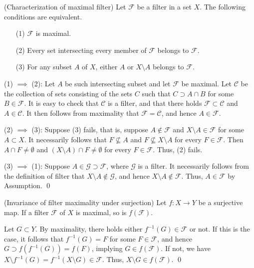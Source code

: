 \documentclass{article}
\begin{document}
\begin{thm}\label{characterize maximal filter} (Characterization of maximal filter)
    Let \( \mathscr{F} \) be a filter in a set \( X \). The following conditions are equivalent.
    \begin{itemize}
        \item[(1)] \( \mathscr{F} \) is maximal.
        \item[(2)] Every set intersecting every member of \( \mathscr{F} \) belongs to \( \mathscr{F} \).
        \item[(3)] For any subset \( A \) of \( X \), either \( A \) or \( X \setminus A \) belongs to \( \mathscr{F} \).
    \end{itemize}
\end{thm}
\begin{prf}
    (1) \( \implies \) (2):
    Let \( A \) be such intersecting subset and let \( \mathscr{F} \) be maximal. Let \( \mathscr{C} \) be the collection of sets consisting of the sets \( C \) such that \( C \supset A \cap B \) for some \( B \in \mathscr{F} \). It is easy to check that \( \mathscr{C} \) is a filter, and that there holds \( \mathscr{F} \subset \mathscr{C} \) and \( A \in \mathscr{C} \). It then follows from maximality that \( \mathscr{F} = \mathscr{C} \), and hence \( A \in \mathscr{F} \).

    (2) \( \implies \) (3):
    Suppose (3) fails, that is, suppose \( A \notin \mathscr{F} \) and \( X \setminus A \in \mathscr{F} \) for some \( A \subset X\). It necessarily follows that \( F \nsubseteq A \) and \( F \nsubseteq X \setminus A \) for every \( F \in \mathscr{F} \). Then \( A \cap F \neq \emptyset \) and \( \left( X \setminus A \right) \cap F \neq \emptyset \) for every \( F \in \mathscr{F} \). Thus, (2) fails.

    (3) \( \implies \) (1):
    Suppose \( A \in \mathscr{G} \supset \mathscr{F} \), where \( \mathscr{G} \) is a filter. It necessarily follows from the definition of filter that \( X \setminus A \notin \mathscr{G} \), and hence \( X \setminus A \notin \mathscr{F} \). Thus, \( A \in \mathscr{F} \) by Assumption.
    \qed\end{prf}

\begin{prp}\label{invariace of maximality under surjection} (Invariance of filter maximality under surjection)
    Let \( f:X \to Y \) be a surjective map. If a filter \( \mathscr{F} \) of \( X \) is maximal, so is \( f(\mathscr{F}) \).
\end{prp}
\begin{prf}
    Let \( G \subset Y \). By maximality, there holds either \( f^{-1}(G)\in \mathscr{F} \) or not. If this is the case, it follows that \( f^{-1}(G) = F \) for some \( F \in \mathscr{F} \), and hence \( G \supset f(f^{-1}(G))=f(F) \), implying \( G \in f(\mathscr{F}) \). If not, we have \( X \setminus f^{-1}(G) = f^{-1}(X \setminus G) \in \mathscr{F} \). Thus, \( X \setminus G \in f(\mathscr{F}) \).
    \qed\end{prf}
\end{document}

